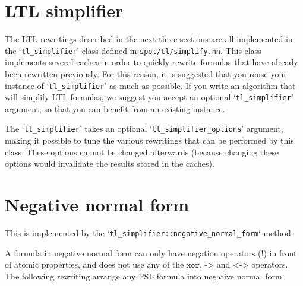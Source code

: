 \documentclass[a4paper,twoside,10pt,DIV=12]{scrreprt}
\DeclareMathOperator{\NOT}{\texttt{!}}
\newcommand{\XOR}{\mathbin{\texttt{xor}}}
\newcommand{\IMPLIES}{\mathbin{\texttt{->}}}
\newcommand{\EQUIV}{\mathbin{\texttt{<->}}}
\newcommand{\0}{\texttt{0}}
\newcommand{\1}{\texttt{1}}
\begin{document}
\section{LTL simplifier}

The LTL rewritings described in the next three sections are all
implemented in the `\verb|tl_simplifier|' class defined in
\texttt{spot/tl/simplify.hh}.  This class implements several
caches in order to quickly rewrite formulas that have already been
rewritten previously.  For this reason, it is suggested that you reuse
your instance of `\verb|tl_simplifier|' as much as possible.  If you
write an algorithm that will simplify LTL formulas, we suggest you
accept an optional `\verb|tl_simplifier|' argument, so that you can
benefit from an existing instance.

The `\verb|tl_simplifier|' takes an optional
`\verb|tl_simplifier_options|' argument, making it possible to tune
the various rewritings that can be performed by this class.  These
options cannot be changed afterwards (because changing these options
would invalidate the results stored in the caches).

\section{Negative normal form}\label{sec:nnf}

This is implemented by the `\verb|tl_simplifier::negative_normal_form|`
method.

A formula in negative normal form can only have negation
operators ($\NOT$) in front of atomic properties, and does not use any
of the $\XOR$, $\IMPLIES$ and $\EQUIV$ operators.  The following
rewriting arrange any PSL formula into negative normal form.
\end{document}
